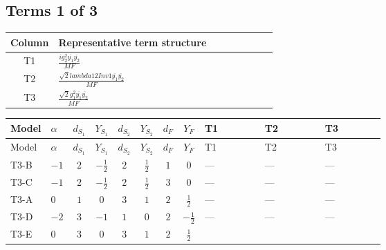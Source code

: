 \documentclass[8pt]{article}
\begin{document}
\begin{landscape}
\subsection*{Terms 1 of 3}
\begin{center}
\begin{tabular}{@{}c >{\raggedright\arraybackslash}p{0.82\linewidth}@{}}
\toprule
Column & Representative term structure \\
\midrule
T1 & \(\displaystyle \frac{i g_{2}^{2} \overline{y_{1}} \overline{y_{2}}}{MF}\) \\
\midrule
T2 & \(\displaystyle \frac{\sqrt{2} lambda12Inv1 \overline{y_{1}} \overline{y_{2}}}{MF}\) \\
\midrule
T3 & \(\displaystyle \frac{\sqrt{2} g_{1}^{2} \overline{y_{1}} \overline{y_{2}}}{MF}\) \\
\midrule
\bottomrule
\end{tabular}
\end{center}
\smallskip
\tiny
\begin{longtable}{@{}llcccccc >{\raggedright\arraybackslash}p{0.21\linewidth} >{\raggedright\arraybackslash}p{0.21\linewidth} >{\raggedright\arraybackslash}p{0.21\linewidth}@{}}
\toprule
Model & $\alpha$ & $d_{S_1}$ & $Y_{S_1}$ & $d_{S_2}$ & $Y_{S_2}$ & $d_F$ & $Y_F$ & T1 & T2 & T3 \\
\midrule
\endfirsthead
\toprule
Model & $\alpha$ & $d_{S_1}$ & $Y_{S_1}$ & $d_{S_2}$ & $Y_{S_2}$ & $d_F$ & $Y_F$ & T1 & T2 & T3 \\
\midrule
\endhead
T3-B & $-1$ & $2$ & $-\frac{1}{2}$ & $2$ & $\frac{1}{2}$ & $1$ & $0$ & --- & --- & --- \\
\midrule
T3-C & $-1$ & $2$ & $-\frac{1}{2}$ & $2$ & $\frac{1}{2}$ & $3$ & $0$ & --- & --- & --- \\
\midrule
T3-A & $0$ & $1$ & $0$ & $3$ & $1$ & $2$ & $\frac{1}{2}$ & --- & --- & --- \\
\midrule
T3-D & $-2$ & $3$ & $-1$ & $1$ & $0$ & $2$ & $-\frac{1}{2}$ & --- & --- & --- \\
\midrule
T3-E & $0$ & $3$ & $0$ & $3$ & $1$ & $2$ & $\frac{1}{2}$ & \scriptsize\adjustbox{max width=\linewidth}{$\begin{gathered} \frac{i g_{2}^{2} \overline{y_{1}} \overline{y_{2}}}{MF}\end{gathered}$} & \scriptsize\adjustbox{max width=\linewidth}{$\begin{gathered} - \frac{\sqrt{2} lambda12Inv1 \overline{y_{1}} \overline{y_{2}}}{4 MF}\end{gathered}$} & \scriptsize\adjustbox{max width=\linewidth}{$\begin{gathered} \frac{3 \sqrt{2} g_{1}^{2} \overline{y_{1}} \overline{y_{2}}}{16 MF}\end{gathered}$} \\
\midrule
\bottomrule
\end{longtable}
\clearpage

\end{landscape}
\end{document}
